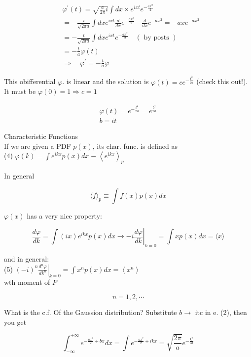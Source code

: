 \documentclass[10pt]{article}
\begin{document}
$$
\begin{aligned}
& \varphi^{\prime}(t)=\sqrt{\frac{a}{2 \pi} i} \int d x \times e^{i x t} e^{-\frac{a x^{2}}{2}} \\
& =-\frac{i}{\sqrt{2 \pi a}} \int d x e^{i x t} \frac{d}{d x} e^{-\frac{a x^{2}}{2}} \quad \frac{d}{d x} e^{-a x^{2}}=-a x e^{-a x^{2}} \\
& =-\frac{t}{\sqrt{2 \pi a}} \int d x e^{i x t} e^{-\frac{a x^{2}}{2}} \quad(\text { by posts }) \\
& =-\frac{t}{a} \varphi(t) \\
& \Rightarrow \quad \varphi^{\prime}=-\frac{t}{a} \varphi
\end{aligned}
$$

This obifferential $\varphi$. is linear and the solution is $\varphi(t)=c e^{-\frac{t^{2}}{2 a}}$ (check this out!). It must be $\varphi(0)=1 \Rightarrow c=1$

$$
\begin{gathered}
\varphi(t)=e^{-\frac{t^{2}}{2 a}}=e^{\frac{b^{2}}{2 a}} \\
b=i t
\end{gathered}
$$

Characteristic Functions\\
If we are given a PDF $p(x)$, its char. func. is defined as\\
(4) $\varphi(k)=\int e^{i k x} p(x) d x \equiv\left\langle e^{i k x}\right\rangle_{p}$

In general

$$
\langle f\rangle_{p} \equiv \int f(x) p(x) d x
$$

$\varphi(x)$ has a very nice property:

$$
\frac{d \varphi}{d k}=\int(i x) e^{i k x} p(x) d x \rightarrow-\left.i \frac{d \varphi}{d k}\right|_{k=0}=\int x p(x) d x=\langle x\rangle
$$

and in general:\\
(5) $\left.(-i)^{n} \frac{d^{n} \varphi}{d k^{n}}\right|_{k=0}=\int x^{n} p(x) d x=\left\langle x^{n}\right\rangle$\\
wth moment of $P$

$$
n=1,2, \cdots
$$

What is the c.f. Of the Gaussion distribution? Substitute $b \rightarrow$ itc in e. (2), then you get


\begin{equation*}
\int_{-\infty}^{+\infty} e^{-\frac{a x^{2}}{2}+b x} d x=\int e^{-\frac{a x^{2}}{2}+i k x}=\sqrt{\frac{2 \pi}{a}} e^{-\frac{k^{2}}{2 a}} \tag{3}
\end{equation*}
\end{document}
